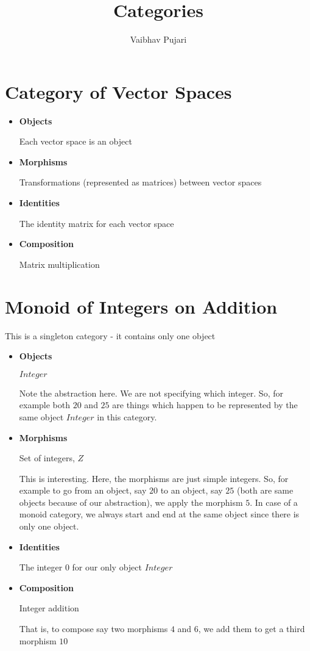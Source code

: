 \documentclass{article}
\author{Vaibhav Pujari}
\title{Categories}
\begin{document}
\section{Category of Vector Spaces}
\begin{itemize}
\item \textbf{Objects}

  Each vector space is an object

\item \textbf{Morphisms}

  Transformations (represented as matrices) between vector spaces

\item \textbf{Identities}

  The identity matrix for each vector space

\item \textbf{Composition}

  Matrix multiplication

\end{itemize}

\section{Monoid of Integers on Addition}
This is a singleton category - it contains only one object
\begin{itemize}
\item \textbf{Objects}

  $Integer$

  Note the abstraction here. We are not specifying which integer. So, for
  example both $20$ and $25$ are things which happen to be represented by the
  same object $Integer$ in this category.

\item \textbf{Morphisms}

  Set of integers, $Z$

  This is interesting. Here, the morphisms are just simple integers. So, for
  example to go from an object, say $20$ to an object, say $25$ (both are same
  objects because of our abstraction), we apply the morphism $5$. In case of a
  monoid category, we always start and end at the same object since there is
  only one object.

\item \textbf{Identities}

  The integer $0$ for our only object $Integer$

\item \textbf{Composition}

  Integer addition

  That is, to compose say two morphisms $4$ and $6$, we add them to get a third
  morphism $10$

\end{itemize}
\end{document}
